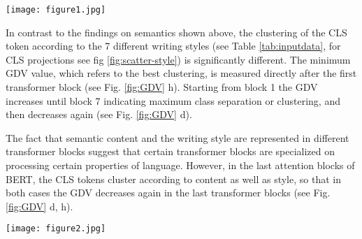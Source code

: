 \begin{figure*}[h!]
    \centering
    \texttt{[image: figure1.jpg]}
    \caption{\textbf{2D projections of CLS token through all transformer blocks colored according to the narrative}\newline The plot shows the 2D projections of the CLS token of the 12 transformer blocks (block 1-12) projected with the MDS method. The colors correspond to the different narratives (fables). The numbers in the legend correspond to the numbers in Table \ref{tab:inputdata} 2nd column.}
    \label{fig:scatter-semantic}
\end{figure*}

In contrast to the findings on semantics shown above, the clustering of the CLS token according to the 7 different writing styles (see Table \ref{tab:inputdata}, for CLS projections see fig \ref{fig:scatter-style}) is significantly different. The minimum GDV value, which refers to the best clustering, is measured directly after the first transformer block (see Fig. \ref{fig:GDV} h). Starting from block 1 the GDV increases until block 7 indicating maximum class separation or clustering, and then decreases again (see Fig. \ref{fig:GDV} d).

The fact that semantic content and the writing style are represented in different transformer blocks suggest that certain transformer blocks are specialized on processing certain properties of language. However, in the last attention blocks of BERT, the CLS tokens cluster according to content as well as style, so that in both cases the GDV decreases again in the last transformer blocks (see Fig. \ref{fig:GDV} d, h).

\begin{figure*}[h!]
    \centering
    \texttt{[image: figure2.jpg]}
    \caption{\textbf{2D projections of CLS token through all transformer blocks colored according to writing style}\newline The plot shows the MDS-projected CLS tokens of the 12 transformer blocks analogously to Fig \ref{fig:scatter-semantic}. The colors of the markers represent the different writing styles (see Table \ref{tab:inputdata} column 3 and 4 to find the according writing style of the numbers in the legend of the plot).}
    \label{fig:scatter-style}
\end{figure*}

